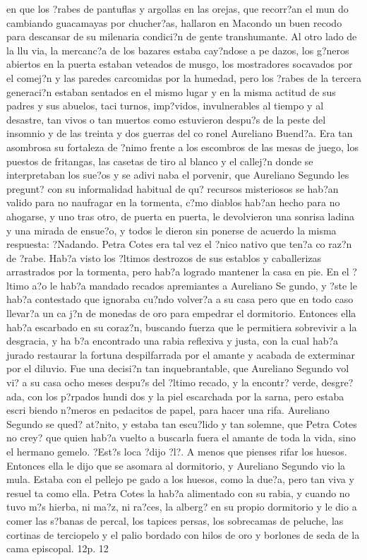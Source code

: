 en que los ?rabes de pantuflas y argollas en las orejas, que recorr?an el mun do cambiando guacamayas por chucher?as, hallaron en Macondo un buen recodo para descansar de su milenaria condici?n de gente transhumante. Al otro lado de la llu via, la mercanc?a de los bazares estaba cay?ndose a pe dazos, los g?neros abiertos en la puerta estaban veteados de musgo, los mostradores socavados por el comej?n y las paredes carcomidas por la humedad, pero los ?rabes de la tercera generaci?n estaban sentados en el mismo lugar y en la misma actitud de sus padres y sus abuelos, taci turnos, imp?vidos, invulnerables al tiempo y al desastre, tan vivos o tan muertos como estuvieron despu?s de la peste del insomnio y de las treinta y dos guerras del co ronel Aureliano Buend?a. Era tan asombrosa su fortaleza de ?nimo frente a los escombros de las mesas de juego, los puestos de fritangas, las casetas de tiro al blanco y el callej?n donde se interpretaban los sue?os y se adivi naba el porvenir, que Aureliano Segundo les pregunt? con su informalidad habitual de qu? recursos misteriosos se hab?an valido para no naufragar en la tormenta, c?mo diablos hab?an hecho para no ahogarse, y uno tras otro, de puerta en puerta, le devolvieron una sonrisa ladina y una mirada de ensue?o, y todos le dieron sin ponerse de acuerdo la misma respuesta: ?Nadando. Petra Cotes era tal vez el ?nico nativo que ten?a co raz?n de ?rabe. Hab?a visto los ?ltimos destrozos de sus establos y caballerizas arrastrados por la tormenta, pero hab?a logrado mantener la casa en pie. En el ?ltimo a?o le hab?a mandado recados apremiantes a Aureliano Se gundo, y ?ste le hab?a contestado que ignoraba cu?ndo volver?a a su casa pero que en todo caso llevar?a un ca j?n de monedas de oro para empedrar el dormitorio. Entonces ella hab?a escarbado en su coraz?n, buscando fuerza que le permitiera sobrevivir a la desgracia, y ha b?a encontrado una rabia reflexiva y justa, con la cual hab?a jurado restaurar la fortuna despilfarrada por el amante y acabada de exterminar por el diluvio. Fue una decisi?n tan inquebrantable, que Aureliano Segundo vol vi? a su casa ocho meses despu?s del ?ltimo recado, y la encontr? verde, desgre?ada, con los p?rpados hundi dos y la piel escarchada por la sarna, pero estaba escri biendo n?meros en pedacitos de papel, para hacer una rifa. Aureliano Segundo se qued? at?nito, y estaba tan escu?lido y tan solemne, que Petra Cotes no crey? que quien hab?a vuelto a buscarla fuera el amante de toda la vida, sino el hermano gemelo. ?Est?s loca ?dijo ?l?. A menos que pienses rifar los huesos. Entonces ella le dijo que se asomara al dormitorio, y Aureliano Segundo vio la mula. Estaba con el pellejo pe gado a los huesos, como la due?a, pero tan viva y resuel ta como ella. Petra Cotes la hab?a alimentado con su rabia, y cuando no tuvo m?s hierba, ni ma?z, ni ra?ces, la alberg? en su propio dormitorio y le dio a comer las s?banas de percal, los tapices persas, los sobrecamas de peluche, las cortinas de terciopelo y el palio bordado con hilos de oro y borlones de seda de la cama episcopal. 12p. 12


